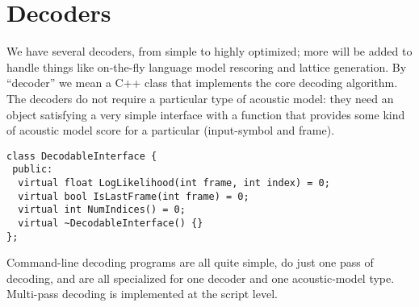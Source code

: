 \documentclass[10pt,conference,letterpaper]{IEEEtran}
\begin{document}



\section{Decoders}
\label{sec:decoder}
We have several decoders, from simple to highly optimized; more will be added 
to handle things like on-the-fly language model rescoring and lattice 
generation.  By ``decoder'' we mean a C++ class that implements the core 
decoding algorithm.  The decoders do not require a particular type of acoustic 
model: they need an object satisfying a very simple interface with a function 
that provides some kind of acoustic model score for a particular (input-symbol 
and frame).  

{\scriptsize
\begin{verbatim}
class DecodableInterface {
 public:
  virtual float LogLikelihood(int frame, int index) = 0;
  virtual bool IsLastFrame(int frame) = 0;
  virtual int NumIndices() = 0;
  virtual ~DecodableInterface() {}
};
\end{verbatim}}

Command-line decoding programs are all quite simple, do just one 
pass of decoding, and are all specialized for one decoder and one 
acoustic-model type.  Multi-pass decoding is implemented at the script level.



\end{document}
